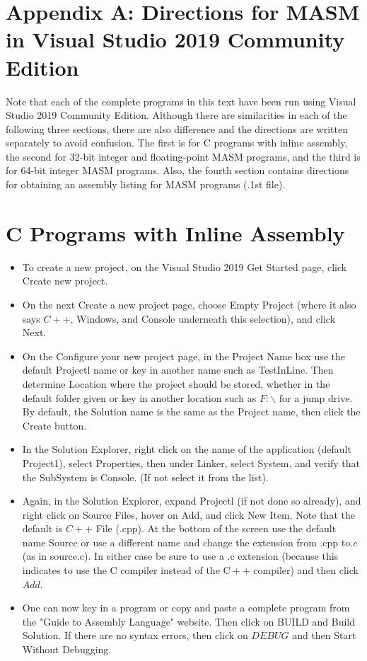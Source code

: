 \documentclass[10pt]{book}
\begin{document}
\section{Appendix A: Directions for MASM in Visual Studio 2019 Community Edition}
Note that each of the complete programs in this text have been run using Visual Studio 2019 Community Edition. Although there are similarities in each of the following three sections, there are also difference and the directions are written separately to avoid confusion. The first is for C programs with inline assembly, the second for 32-bit integer and floating-point MASM programs, and the third is for 64-bit integer MASM programs. Also, the fourth section contains directions for obtaining an assembly listing for MASM programs (.1st file).

\section{C Programs with Inline Assembly}
\begin{itemize}
  \item To create a new project, on the Visual Studio 2019 Get Started page, click Create new project.
  \item On the next Create a new project page, choose Empty Project (where it also says $C++$, Windows, and Console underneath this selection), and click Next.
  \item On the Configure your new project page, in the Project Name box use the default Projectl name or key in another name such as TestInLine. Then determine Location where the project should be stored, whether in the default folder given or key in another location such as $F: \backslash$ for a jump drive. By default, the Solution name is the same as the Project name, then click the Create button.
  \item In the Solution Explorer, right click on the name of the application (default Project1), select Properties, then under Linker, select System, and verify that the SubSystem is Console. (If not select it from the list).
  \item Again, in the Solution Explorer, expand Projectl (if not done so already), and right click on Source Files, hover on Add, and click New Item. Note that the default is $C++$ File (.cpp). At the bottom of the screen use the default name Source or use a different name and change the extension from .cpp to.$c$ (as in source.c). In either case be sure to use a .c extension (because this indicates to use the C compiler instead of the $\mathrm{C}++$ compiler) and then click $A d d$.
  \item One can now key in a program or copy and paste a complete program from the "Guide to Assembly Language" website. Then click on BUILD and Build Solution. If there are no syntax errors, then click on $D E B U G$ and then Start Without Debugging.
\end{itemize}
\end{document}

